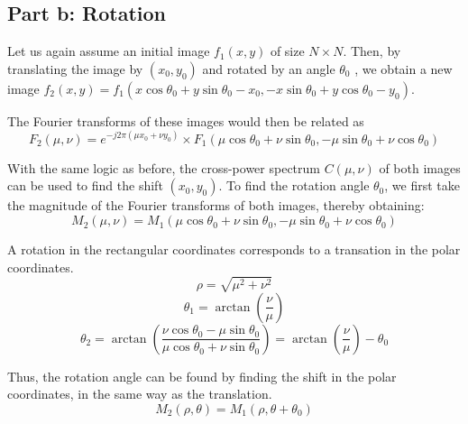 \documentclass{article}
\begin{document}
\subsection*{Part b: Rotation}
Let us again assume an initial image $f_1(x, y)$ of size $N \times N$. Then, by translating the image by $(x_0, y_0)$ and rotated by an angle $\theta_0$
, we obtain a new image $ f_2(x, y) = f_1(x \cos \theta_0 + y \sin \theta_0 - x_0, -x \sin \theta_0 + y \cos \theta_0 - y_0)$. 

The Fourier transforms of these images would then be related as
\[
    F_2(\mu, \nu) = e^{-j 2 \pi (\mu x_0 + \nu y_0)} \times F_1(\mu \cos \theta_0 + \nu \sin \theta_0, -\mu \sin \theta_0 + \nu \cos \theta_0)
\]

With the same logic as before, the cross-power spectrum $C(\mu, \nu)$ of both images can be used to find the shift $(x_0, y_0)$.
\newline
\newline
To find the rotation angle $\theta_0$, we first take the magnitude of the Fourier transforms of both images, thereby obtaining:
\[
    M_2(\mu, \nu) = M_1(\mu \cos \theta_0 + \nu \sin \theta_0, -\mu \sin \theta_0 + \nu \cos \theta_0)
\]

A rotation in the rectangular coordinates corresponds to a transation in the polar coordinates. 
\[
\rho = \sqrt{\mu^2 + \nu^2}
\]
\[
\theta_1 = \arctan\left(\frac{\nu}{\mu}\right)
\]
\[
\theta_2 = \arctan\left(\frac{\nu \cos \theta_0 - \mu \sin \theta_0}{\mu \cos \theta_0 + \nu \sin \theta_0}\right) 
= \arctan\left(\frac{\nu}{\mu}\right) - \theta_0
\]

Thus, the rotation angle can be found by finding the shift in the polar coordinates, in the same way as the translation.
\[
M_2(\rho, \theta) = M_1(\rho, \theta +  \theta_0)
\]
\end{document}
